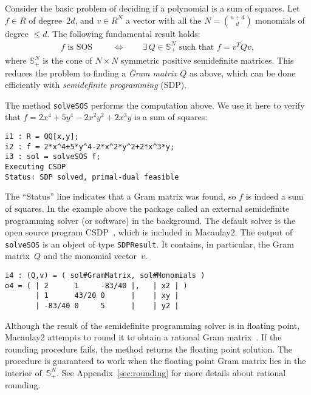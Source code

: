 \documentclass[11pt]{amsart}
\theoremstyle{plain}%
\theoremstyle{definition}
\theoremstyle{remark}
\newcommand{\Mac}{Macaulay2\xspace}
\begin{document}
Consider the basic problem of deciding if a polynomial is a sum of squares.
Let $f \!\in\! R$ of degree~$2d$,
and $v \!\in\! R^N$ a vector with all the $N \!=\! \binom{n+d}{d}$ monomials of degree $\leq\!d$.
The following fundamental result holds:
\begin{align*}
  f \text{ is SOS } 
  \qquad\iff\qquad
  \exists\, Q\in \mathbb{S}_+^N \text{ such that } f = v^T Q v,
\end{align*}
where $\mathbb{S}_+^N$ is the cone of $N{\times} N$ symmetric positive semidefinite matrices.
This reduces the problem to finding a \emph{Gram matrix} $Q$ as above, which can be done efficiently with \emph{semidefinite programming} (SDP).

The method \verb|solveSOS| performs the computation above.
We use it here to verify that $f = 2 x^4 {+} 5 y^4 {-} 2 x^2 y^2 {+} 2 x^3 y$ is a sum of squares:
{\small
\begin{verbatim}
i1 : R = QQ[x,y];
i2 : f = 2*x^4+5*y^4-2*x^2*y^2+2*x^3*y;
i3 : sol = solveSOS f;
Executing CSDP
Status: SDP solved, primal-dual feasible
\end{verbatim}
}
\noindent
The ``Status'' line indicates that a Gram matrix was found, so $f$ is indeed a sum of squares.
In the example above the package called an external semidefinite programming solver (or software) in the background.
The default solver is the open source program CSDP~\cite{borchers1999csdp}, which is included in \Mac.
The output of \verb|solveSOS| is an object of type \verb|SDPResult|.
It contains, in particular, the Gram matrix~$Q$ and the monomial vector~$v$.
{\small
\begin{verbatim}
i4 : (Q,v) = ( sol#GramMatrix, sol#Monomials )
o4 = ( | 2      1     -83/40 |,   | x2 | )
       | 1      43/20 0      |    | xy | 
       | -83/40 0     5      |    | y2 | 
\end{verbatim}
}
\noindent
Although the result of the semidefinite programming solver is in floating point, Macaulay2 attempts to round it to obtain a rational Gram matrix~\cite{peyrl2008computing}.
If the rounding procedure fails, the method returns the floating point solution.
The procedure is guaranteed to work when the floating point Gram matrix lies in the interior of~$\mathbb{S}_+^N$.
See Appendix~\ref{sec:rounding} for more details about rational rounding.
\end{document}

